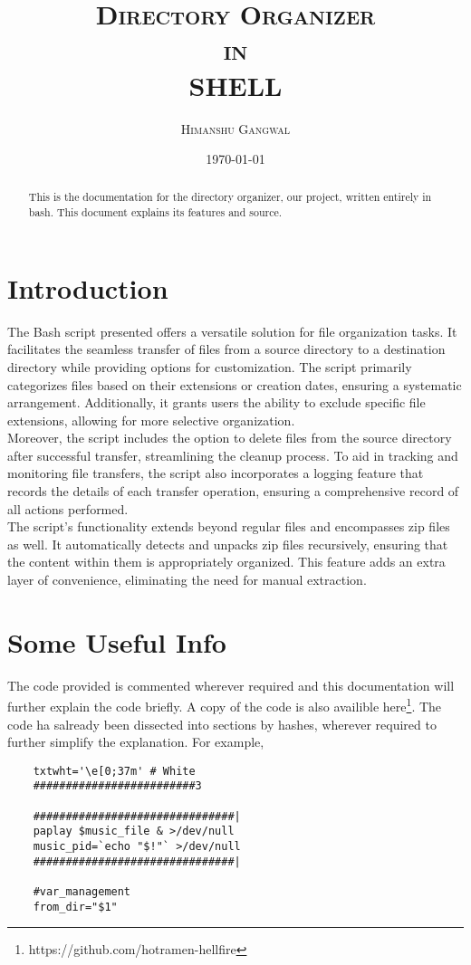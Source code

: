 \documentclass[12pt]{article}
\title{\textsc{\Huge {Directory Organizer \\ in \\ SHELL}}}
\author{\textsc{Himanshu Gangwal}}
\date{\textsc{\today}}
\begin{document}
\maketitle

\begin{abstract}
    This is the documentation for the directory organizer, our project, written entirely in bash. This document explains its features and source.
\end{abstract}

\tableofcontents
\clearpage

\section{Introduction}
    \begin{flushleft}
    The Bash script presented offers a versatile solution for file organization tasks. It facilitates the seamless transfer of files from a source directory to a destination directory while providing options for customization. The script primarily categorizes files based on their extensions or creation dates, ensuring a systematic arrangement. Additionally, it grants users the ability to exclude specific file extensions, allowing for more selective organization.\\
    Moreover, the script includes the option to delete files from the source directory after successful transfer, streamlining the cleanup process. To aid in tracking and monitoring file transfers, the script also incorporates a logging feature that records the details of each transfer operation, ensuring a comprehensive record of all actions performed.\\
    The script's functionality extends beyond regular files and encompasses zip files as well. It automatically detects and unpacks zip files recursively, ensuring that the content within them is appropriately organized. This feature adds an extra layer of convenience, eliminating the need for manual extraction.
    \end{flushleft}

\section{Some Useful Info}
    \begin{flushleft}
        The code provided is commented wherever required and this documentation will further explain the code briefly. A copy of the code is also availible here\footnote{https://github.com/hotramen-hellfire}. The code ha salready been dissected into sections by hashes, wherever required to further simplify the explanation. For example, 
    \begin{verbatim}
    txtwht='\e[0;37m' # White
    #########################3
        
    ###############################|
    paplay $music_file & >/dev/null
    music_pid=`echo "$!"` >/dev/null
    ###############################|
        
    #var_management
    from_dir="$1"
    \end{verbatim}
        \end{flushleft}
\end{document}
